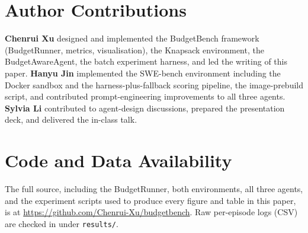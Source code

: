 \documentclass[11pt]{article}
\begin{document}
\section*{Author Contributions}

\textbf{Chenrui Xu} designed and implemented the BudgetBench framework
(BudgetRunner, metrics, visualisation), the Knapsack environment, the
BudgetAwareAgent, the batch experiment harness, and led the writing of
this paper. \textbf{Hanyu Jin} implemented the SWE-bench environment
including the Docker sandbox and the harness-plus-fallback scoring
pipeline, the image-prebuild script, and contributed prompt-engineering
improvements to all three agents. \textbf{Sylvia Li} contributed to
agent-design discussions, prepared the presentation deck, and
delivered the in-class talk.

\section*{Code and Data Availability}

The full source, including the BudgetRunner, both environments, all three
agents, and the experiment scripts used to produce every figure and table
in this paper, is at \url{https://github.com/Chenrui-Xu/budgetbench}. Raw
per-episode logs (CSV) are checked in under \texttt{results/}.



\end{document}
